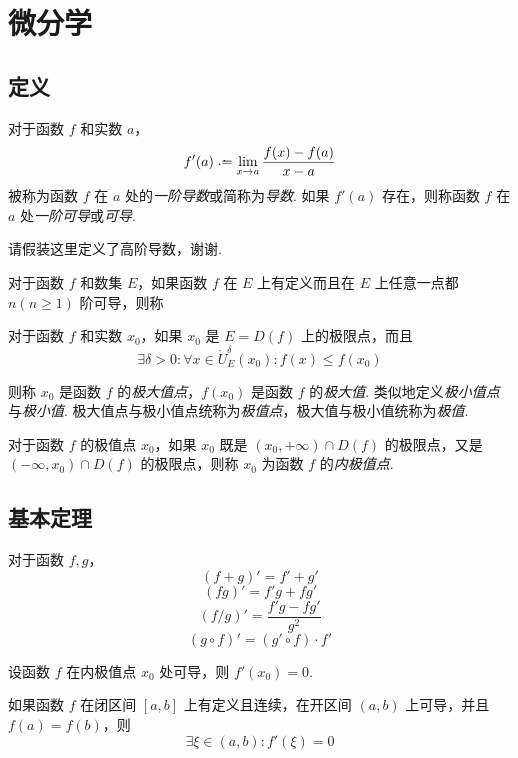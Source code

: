 \section{微分学}
\subsection{定义}
\begin{definition}
    对于函数 $f$ 和实数 $a$，
    \[f'(a) \defeq \lim_{x \rightarrow a} \frac{f(x)-f(a)}{x-a}\]
    被称为函数 $f$ 在 $a$ 处的\emph{一阶导数}或简称为\emph{导数}. 如果 $f'(a)$ 存在，则称函数 $f$ 在 $a$ 处\emph{一阶可导}或\emph{可导}.
\end{definition}\vspace{9pt}

\begin{definition}
    请假装这里定义了高阶导数，谢谢.
\end{definition}\vspace{9pt}

\begin{definition}
    对于函数 $f$ 和数集 $E$，如果函数 $f$ 在 $E$ 上有定义而且在 $E$ 上任意一点都 $n(n \geqslant 1)$ 阶可导，则称
\end{definition}

\begin{definition}
    对于函数 $f$ 和实数 $x_0$，如果 $x_0$ 是 $E = D(f)$ 上的极限点，而且
    \[\exists \delta > 0: \forall x \in \mathring{U}_E^\delta(x_0): f(x) \leqslant f(x_0)\]
    
    则称 $x_0$ 是函数 $f$ 的\emph{极大值点}，$f(x_0)$ 是函数 $f$ 的\emph{极大值}. 类似地定义\emph{极小值点}与\emph{极小值}. 极大值点与极小值点统称为\emph{极值点}，极大值与极小值统称为\emph{极值}.
\end{definition}\vspace{9pt}

\begin{definition}
    对于函数 $f$ 的极值点 $x_0$，如果 $x_0$ 既是 $(x_0, +\infty) \cap D(f)$ 的极限点，又是 $(-\infty, x_0) \cap D(f)$ 的极限点，则称 $x_0$ 为函数 $f$ 的\emph{内极值点}.
\end{definition}

\subsection{基本定理}
\begin{theorem}
    对于函数 $f,g$，
    \[(f+g)' = f' + g'\]
    \[(fg)' = f'g + fg'\]
    \[(f/g)' = \frac{f'g - fg'}{g^2}\]
    \[(g \circ f)' = (g'\circ f) \cdot f'\]
\end{theorem}\vspace{9pt}

\begin{theorem}
    设函数 $f$ 在内极值点 $x_0$ 处可导，则 $f'(x_0) = 0$.
\end{theorem}\vspace{9pt}

\begin{theorem}
    如果函数 $f$ 在闭区间 $[a,b]$ 上有定义且连续，在开区间 $(a,b)$ 上可导，并且 $f(a) = f(b)$，则
    \[\exists \xi \in (a,b): f'(\xi) = 0\]
\end{theorem}\vspace{9pt}